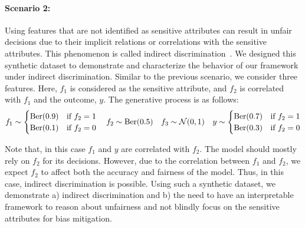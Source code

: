  

\paragraph{Scenario 2:} Using features that are not identified as sensitive attributes can result in unfair decisions due to their implicit relations or correlations with the sensitive attributes. This phenomenon is called indirect discrimination~\cite{zliobaite2015survey,6175897,ijcai2017-549}. We designed this synthetic dataset to demonstrate and characterize  the behavior of our framework under indirect discrimination. Similar to the previous scenario, we consider three features. Here,  $f_1$ is considered as the sensitive attribute, and $f_2$ is correlated with $f_1$ and the outcome, $y$. The generative process is as follows:
\begin{equation*}
    f_1\sim \begin{cases}
        \text{Ber}(0.9) & \text{if } f_2=1\\
        \text{Ber}(0.1) & \text{if } f_2=0
    \end{cases}
    \quad f_2\sim\text{Ber}(0.5)
    \quad f_3\sim \mathcal N (0,1)
    \quad y\sim \begin{cases}
        \text{Ber}(0.7) & \text{if } f_2=1\\
        \text{Ber}(0.3) & \text{if } f_2=0
    \end{cases}
\end{equation*}

Note that, in this case $f_1$ and $y$ are correlated with 
$f_2$. The model should mostly rely on $f_2$ for its decisions. 
However, due to the correlation between $f_1$ and $f_2$, we expect $f_2$ to affect both the accuracy and fairness of the model. Thus, in this case, indirect discrimination is possible. Using such a synthetic dataset, we demonstrate a) indirect discrimination and b) the need  to have  an interpretable framework to reason about unfairness and not blindly focus on the sensitive attributes for bias mitigation.


